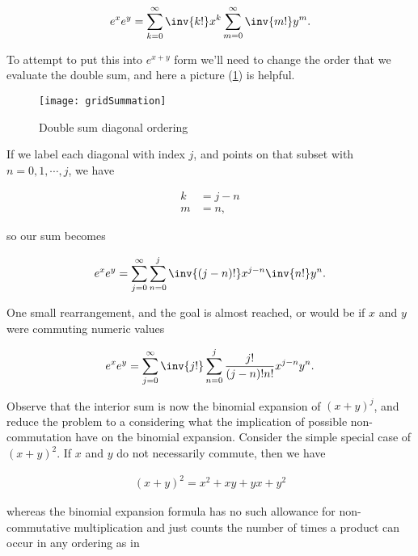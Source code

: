 \begin{align}\label{eqn:exponentialCommutation:3}
e^{x} e^{y} = 
\sum_{k=0}^\infty \inv{k!} x^k
\sum_{m=0}^\infty \inv{m!} y^m.
\end{align}

To attempt to put this into $e^{x + y}$ form we'll need to change the order that we evaluate the double sum, and here a picture (\ref{fig:gridSummation}) is helpful.

\begin{figure}[htp]
\centering
\texttt{[image: gridSummation]}
\caption{Double sum diagonal ordering}\label{fig:gridSummation}
\end{figure}

If we label each diagonal with index $j$, and points on that subset with $n=0,1,\cdots, j$, we have

\begin{align}\label{eqn:exponentialCommutation:4}
k &= j - n \\
m &= n,
\end{align}

so our sum becomes

\begin{align}\label{eqn:exponentialCommutation:5}
e^{x} e^{y} = 
\sum_{j=0}^\infty \sum_{n=0}^j
\inv{(j-n)!} x^{j-n}
\inv{n!} y^n.
\end{align}

One small rearrangement, and the goal is almost reached, or would be if $x$ and $y$ were commuting numeric values

\begin{align}\label{eqn:exponentialCommutation:6}
e^{x} e^{y} = 
\sum_{j=0}^\infty \inv{j!} \sum_{n=0}^j \frac{j!}{(j-n)! n!} x^{j-n} y^n.
\end{align}

Observe that the interior sum is now the binomial expansion of $(x + y)^j$, and reduce the problem to a considering what the implication of possible non-commutation have on the binomial expansion.  Consider the simple special case of $(x + y)^2$.  If $x$ and $y$ do not necessarily commute, then we have

\begin{align}\label{eqn:exponentialCommutation:7}
(x + y)^2 = x^2 + x y + y x + y^2
\end{align}

whereas the binomial expansion formula has no such allowance for non-commutative multiplication and just counts the number of times a product can occur in any ordering as in

